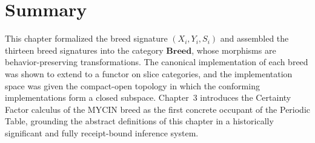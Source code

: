 \section{Summary}
\label{sec:ch2-summary}

This chapter formalized the breed signature $(X_i, Y_i, S_i)$ and assembled the
thirteen breed signatures into the category $\mathbf{Breed}$, whose morphisms are
behavior-preserving transformations.  The canonical implementation of each breed
was shown to extend to a functor on slice categories, and the implementation space
was given the compact-open topology in which the conforming implementations form a
closed subspace.  Chapter~3 introduces the Certainty Factor calculus of the MYCIN
breed as the first concrete occupant of the Periodic Table, grounding the abstract
definitions of this chapter in a historically significant and fully receipt-bound
inference system.
